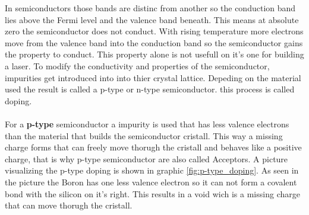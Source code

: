 In semiconductors those bands are distinc from another so the conduction band lies above the Fermi level and the valence band beneath.
This means at absolute zero the semiconductor does not conduct.
With rising temperature more electrons move from the valence band into the conduction band so the semiconductor gains the property to conduct.
This property alone is not usefull on it's one for building a laser.
To modify the conductivity and properties of the semiconductor, impurities get introduced into into thier crystal lattice.
Depeding on the material used the result is called a p-type or n-type semiconductor.
this process is called doping.
\\\\
\FloatBarrier
For a \textbf{p-type} semiconductor a impurity is used that has less valence electrons than the material that builds the semiconductor cristall.
This way a missing charge forms that can freely move thorugh the cristall and behaves like a positive charge, that is why p-type semiconductor are also called Acceptors.
A picture visualizing the p-type doping is shown in graphic \ref{fig:p-type_doping}.
As seen in the picture the Boron has one less valence electron so it can not form a covalent bond with the silicon on it's right.
This results in a void wich is a missing charge that can move thorugh the cristall.

